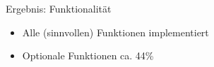 \begin{frame}{Ergebnis: Funktionalität}
    \begin{itemize}
      \item Alle (sinnvollen) Funktionen implementiert
      \item Optionale Funktionen ca. 44\%
    \end{itemize}
\end{frame} 